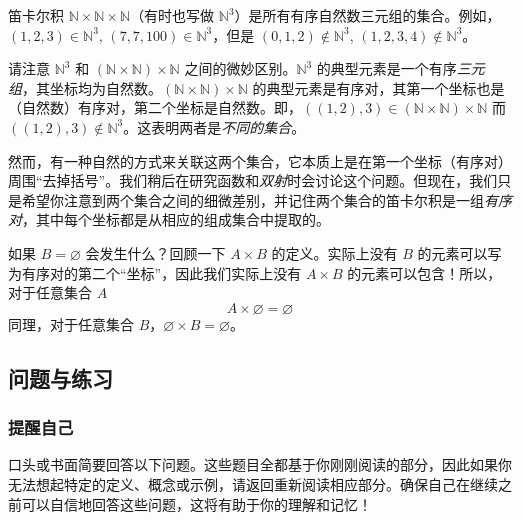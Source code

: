 \begin{example}
    笛卡尔积 $\mathbb{N} \times \mathbb{N} \times \mathbb{N}$（有时也写做 $\mathbb{N}^3$）是所有有序自然数三元组的集合。例如，$(1, 2, 3) \in \mathbb{N}^3$, $(7, 7, 100) \in \mathbb{N}^3$，但是 $(0, 1, 2) \notin \mathbb{N}^3$, $(1, 2, 3, 4) \notin \mathbb{N}^3$。
\end{example}

请注意 $\mathbb{N}^3$ 和 $(\mathbb{N} \times \mathbb{N}) \times \mathbb{N}$ 之间的微妙区别。$\mathbb{N}^3$ 的典型元素是一个有序\emph{三元组}，其坐标均为自然数。$(\mathbb{N} \times \mathbb{N}) \times \mathbb{N}$ 的典型元素是有序对，其第一个坐标也是（自然数）有序对，第二个坐标是自然数。即，$((1, 2), 3) \in (\mathbb{N} \times \mathbb{N}) \times \mathbb{N}$ 而 $((1, 2), 3) \notin \mathbb{N}^3$。这表明两者是\emph{不同的集合}。

然而，有一种自然的方式来关联这两个集合，它本质上是在第一个坐标（有序对）周围``去掉括号''。我们稍后在研究函数和\emph{双射}时会讨论这个问题。但现在，我们只是希望你注意到两个集合之间的细微差别，并记住两个集合的笛卡尔积是一组\emph{有序对}，其中每个坐标都是从相应的组成集合中提取的。\\

\begin{example}
    如果 $B = \varnothing$ 会发生什么？回顾一下 $A \times B$ 的定义。实际上没有 $B$ 的元素可以写为有序对的第二个``坐标''，因此我们实际上没有 $A \times B$ 的元素可以包含！所以，对于任意集合 $A$
    \[A \times \varnothing = \varnothing\]
    同理，对于任意集合 $B$，$\varnothing \times B = \varnothing$。
\end{example}

\subsection{问题与练习}

\subsubsection*{提醒自己}

口头或书面简要回答以下问题。这些题目全都基于你刚刚阅读的部分，因此如果你无法想起特定的定义、概念或示例，请返回重新阅读相应部分。确保自己在继续之前可以自信地回答这些问题，这将有助于你的理解和记忆！

